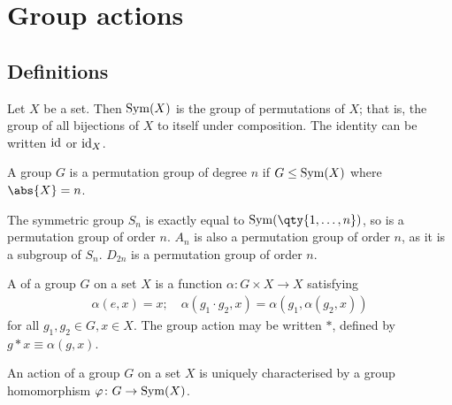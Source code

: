 \section{Group actions}

\subsection{Definitions}
\begin{definition}
	Let $X$ be a set.
	Then $\operatorname{Sym}(X)$ is the group of permutations of $X$; that is, the group of all bijections of $X$ to itself under composition.
	The identity can be written $\operatorname{id}$ or $\operatorname{id}_X$.
\end{definition}

\begin{definition}
	A group $G$ is a permutation group of degree $n$ if $G \leq \operatorname{Sym}(X)$ where $\abs{X} = n$.
\end{definition}

\begin{example}
	The symmetric group $S_n$ is exactly equal to $\Sym(\qty{1, \dots, n})$, so is a permutation group of order $n$.
	$A_n$ is also a permutation group of order $n$, as it is a subgroup of $S_n$.
	$D_{2n}$ is a permutation group of order $n$.
\end{example}

\begin{definition}
	A  of a group $G$ on a set $X$ is a function $\alpha \colon G \times X \to X$ satisfying
	\begin{align*}
		\alpha(e, x) = x;\quad \alpha(g_1 \cdot g_2, x) = \alpha(g_1, \alpha(g_2, x))
	\end{align*}
	for all $g_1, g_2 \in G, x \in X$.
	The group action may be written $\ast$, defined by $g \ast x \equiv \alpha(g,x)$.
\end{definition}

\begin{proposition}
	An action of a group $G$ on a set $X$ is uniquely characterised by a group homomorphism $\varphi \colon G \to \operatorname{Sym}(X)$.
\end{proposition}

